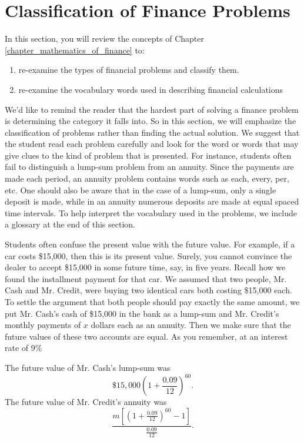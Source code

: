 \section{Classification of Finance Problems}

In this section, you will review the concepts of Chapter \ref{chapter_mathematics_of_finance} to:
\begin{enumerate}
    \item re-examine the types of financial problems and classify them.
    \item re-examine the vocabulary words used in describing financial calculations
\end{enumerate}

We'd like to remind the reader that the hardest part of solving a finance problem is determining the category it falls into. So in this section, we will emphasize the classification of problems rather than finding the actual solution. We suggest that the student read each problem carefully and look for the word or words that may give clues to the kind of problem that is presented. For instance, students often fail to distinguish a lump-sum problem from an annuity. Since the payments are made each period, an annuity problem contains words such as each, every, per, etc. One should also be aware that in the case of a lump-sum, only a single deposit is made, while in an annuity numerous deposits are made at equal spaced time intervals. To help interpret the vocabulary used in the problems, we include a glossary at the end of this section.

Students often confuse the present value with the future value. For example, if a car costs \$15,000, then this is its present value. Surely, you cannot convince the dealer to accept \$15,000 in some future time, say, in five years. Recall how we found the installment payment for that car. We assumed that two people, Mr. Cash and Mr. Credit, were buying two identical cars both costing \$15,000 each. To settle the argument that both people should pay exactly the same amount, we put Mr. Cash's cash of \$15,000 in the bank as a lump-sum and Mr. Credit's monthly payments of $x$ dollars each as an annuity. Then we make sure that the future values of these two accounts are equal. As you remember, at an interest rate of 9\%

The future value of Mr. Cash's lump-sum was \[\$15,000\left(1 + \frac{0.09}{12}\right)^{60}.\] The future value of Mr. Credit's annuity was \[\frac{m\left[\left(1+\frac{0.09}{12}\right)^{60}-1\right]}{\frac{0.09}{12}}.\]


